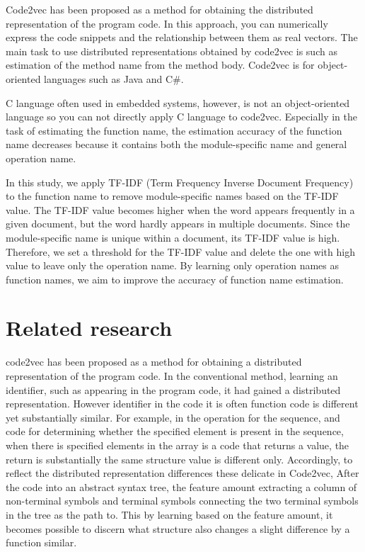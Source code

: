 \documentclass[JIP]{apris}
\begin{document}
Code2vec has been proposed as a method for obtaining the distributed representation of the program code. In this approach, you can numerically express the code snippets and the relationship between them as real vectors. The main task to use distributed representations obtained by code2vec is such as estimation of the method name from the method body. Code2vec is for object-oriented languages such as Java and C\#.

C language often used in embedded systems, however, is not an object-oriented language so you can not directly apply C language to code2vec. Especially in the task of estimating the function name, the estimation accuracy of the function name decreases because it contains both the module-specific name and general operation name.

In this study, we apply TF-IDF (Term Frequency Inverse Document Frequency) to the function name to remove module-specific names based on the TF-IDF value. The TF-IDF value becomes higher when the word appears frequently in a given document, but the word hardly appears in multiple documents. Since the module-specific name is unique within a document, its TF-IDF value is high. Therefore, we set a threshold for the TF-IDF value and delete the one with high value to leave only the operation name. By learning only operation names as function names, we aim to improve the accuracy of function name estimation.


\section{Related research}
code2vec has been proposed as a method for obtaining a distributed representation of the program code. In the conventional method, learning an identifier, such as appearing in the program code, it had gained a distributed representation. However identifier in the code it is often function code is different yet substantially similar. For example, in the operation for the sequence, and code for determining whether the specified element is present in the sequence, when there is specified elements in the array is a code that returns a value, the return is substantially the same structure value is different only. Accordingly, to reflect the distributed representation differences these delicate in Code2vec, After the code into an abstract syntax tree, the feature amount extracting a column of non-terminal symbols and terminal symbols connecting the two terminal symbols in the tree as the path to. This by learning based on the feature amount, it becomes possible to discern what structure also changes a slight difference by a function similar.
\end{document}
